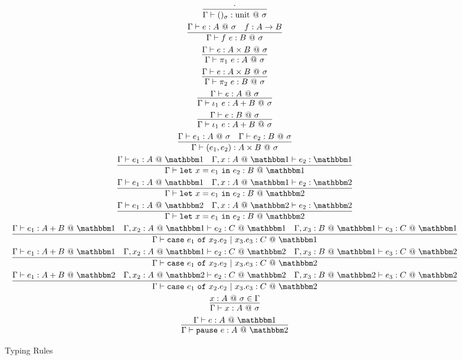 \documentclass[11pt]{article}
\makeatletter
\newcommand {\bbone} {\mathbbm 1}
\newcommand {\bbtwo} {\mathbbm 2}
\newcommand {\at} {{\tt~@~}}
\newcommand {\pause} {{\tt pause}}
\newcommand {\letin} [3] {{\tt let}~{#1} = {#2}~{\tt in}~{#3}}
\newcommand {\caseof} [3] {{\tt case}~{#1} ~{\tt of}~{#2}~{\tt |}~{#3}}
\newcommand {\inferenceSpacing}{\setlength{\jot}{1.8ex}}
\makeatother
\begin{document}
\begin{figure}
\caption{Typing Rules}
\label{fig:staging}
\inferenceSpacing
\begin{gather}
\infer {\Gamma\vdash ()_\sigma : \text{unit}\at\sigma}{\cdot} \\
\infer {\Gamma\vdash f~e : B\at\sigma}{\Gamma\vdash e : A\at\sigma & f : A \to B} \\
\infer {\Gamma\vdash \pi_1~e : A \at \sigma}{\Gamma\vdash e : A\times B \at \sigma} \\
\infer {\Gamma\vdash \pi_2~e : B \at \sigma}{\Gamma\vdash e : A\times B \at \sigma} \\
\infer {\Gamma\vdash \iota_1~e : A+B\at\sigma}{\Gamma\vdash e : A\at\sigma} \\
\infer {\Gamma\vdash \iota_1~e : A+B\at\sigma}{\Gamma\vdash e : B\at\sigma} \\
\infer {\Gamma\vdash (e_1,e_2) : A\times B \at \sigma}{\Gamma\vdash e_1 : A \at \sigma & \Gamma\vdash e_2 : B \at \sigma} \\
\infer {\Gamma\vdash \letin {x}{e_1}{e_2} : B \at \bbone}{\Gamma\vdash e_1 : A \at \bbone & \Gamma,x:A \at \bbone \vdash e_2 : \bbone} \\
\infer {\Gamma\vdash \letin {x}{e_1}{e_2} : B \at \bbtwo}{\Gamma\vdash e_1 : A \at \bbone & \Gamma,x:A \at \bbone \vdash e_2 : \bbtwo} \\
\infer {\Gamma\vdash \letin {x}{e_1}{e_2} : B \at \bbtwo}{\Gamma\vdash e_1 : A \at \bbtwo & \Gamma,x:A \at \bbtwo \vdash e_2 : \bbtwo} \\
\infer {\Gamma\vdash \caseof {e_1}{x_2.e_2}{x_3.e_3} : C\at\bbone}{\Gamma\vdash e_1 : A+B\at\bbone & \Gamma,x_2:A\at\bbone \vdash e_2 : C\at\bbone & \Gamma,x_3:B\at\bbone \vdash e_3 : C\at\bbone} \\
\infer {\Gamma\vdash \caseof {e_1}{x_2.e_2}{x_3.e_3} : C\at\bbtwo}{\Gamma\vdash e_1 : A+B\at\bbone & \Gamma,x_2:A\at\bbone \vdash e_2 : C\at\bbtwo & \Gamma,x_3:B\at\bbone \vdash e_3 : C\at\bbtwo} \\
\infer {\Gamma\vdash \caseof {e_1}{x_2.e_2}{x_3.e_3} : C\at\bbtwo}{\Gamma\vdash e_1 : A+B\at\bbtwo & \Gamma,x_2:A\at\bbtwo \vdash e_2 : C\at\bbtwo & \Gamma,x_3:B\at\bbtwo \vdash e_3 : C\at\bbtwo} \\
\infer {\Gamma\vdash x : A\at\sigma}{x : A\at\sigma \in \Gamma} \\
\infer {\Gamma\vdash \pause~e : A\at\bbtwo}{\Gamma\vdash e : A\at\bbone}
\end{gather}
\end{figure}
\end{document}

